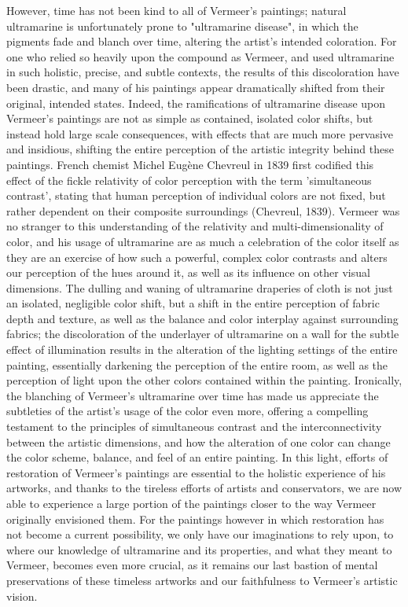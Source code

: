 However, time has not been kind to all of Vermeer's paintings; natural
ultramarine is unfortunately prone to "ultramarine disease", in which
the pigments fade and blanch over time, altering the artist's intended
coloration. For one who relied so heavily upon the compound as Vermeer,
and used ultramarine in such holistic, precise, and subtle contexts, the
results of this discoloration have been drastic, and many of his
paintings appear dramatically shifted from their original, intended
states. Indeed, the ramifications of ultramarine disease upon Vermeer's
paintings are not as simple as contained, isolated color shifts, but
instead hold large scale consequences, with effects that are much more
pervasive and insidious, shifting the entire perception of the artistic
integrity behind these paintings. French chemist Michel Eugène Chevreul
in 1839 first codified this effect of the fickle relativity of color
perception with the term 'simultaneous contrast', stating that human
perception of individual colors are not fixed, but rather dependent on
their composite surroundings (Chevreul, 1839). Vermeer was no stranger
to this understanding of the relativity and multi-dimensionality of
color, and his usage of ultramarine are as much a celebration of the
color itself as they are an exercise of how such a powerful, complex
color contrasts and alters our perception of the hues around it, as well
as its influence on other visual dimensions. The dulling and waning of
ultramarine draperies of cloth is not just an isolated, negligible color
shift, but a shift in the entire perception of fabric depth and texture,
as well as the balance and color interplay against surrounding fabrics;
the discoloration of the underlayer of ultramarine on a wall for the
subtle effect of illumination results in the alteration of the lighting
settings of the entire painting, essentially darkening the perception of
the entire room, as well as the perception of light upon the other
colors contained within the painting. Ironically, the blanching of
Vermeer's ultramarine over time has made us appreciate the subtleties of
the artist's usage of the color even more, offering a compelling
testament to the principles of simultaneous contrast and the
interconnectivity between the artistic dimensions, and how the
alteration of one color can change the color scheme, balance, and feel
of an entire painting. In this light, efforts of restoration of
Vermeer's paintings are essential to the holistic experience of his
artworks, and thanks to the tireless efforts of artists and
conservators, we are now able to experience a large portion of the
paintings closer to the way Vermeer originally envisioned them. For the
paintings however in which restoration has not become a current
possibility, we only have our imaginations to rely upon, to where our
knowledge of ultramarine and its properties, and what they meant to
Vermeer, becomes even more crucial, as it remains our last bastion of
mental preservations of these timeless artworks and our faithfulness to
Vermeer's artistic vision.

